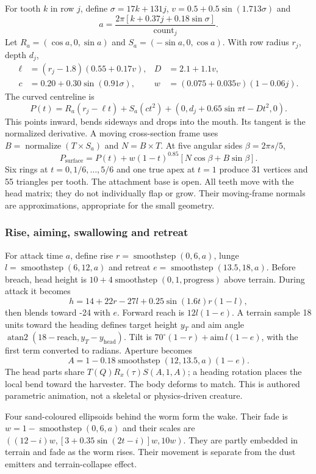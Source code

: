 For tooth $k$ in row $j$, define $\sigma=17k+131j$, $v=0.5+0.5\sin(1.713\sigma)$ and
\begin{equation}
a=\frac{2\pi[k+0.37j+0.18\sin\sigma]}{\mathrm{count}_j}.
\end{equation}
Let $R_a=(\cos a,0,\sin a)$ and $S_a=(-\sin a,0,\cos a)$. With row radius $r_j$, depth $d_j$,
\begin{align}
\ell&=(r_j-1.8)(0.55+0.17v),&D&=2.1+1.1v,\\
c&=0.20+0.30\sin(0.91\sigma),&w&=(0.075+0.035v)(1-0.06j).
\end{align}
The curved centreline is
\begin{equation}
P(t)=R_a(r_j-\ell t)+S_a(ct^2)+(0,d_j+0.65\sin\pi t-Dt^2,0).
\end{equation}
This points inward, bends sideways and drops into the mouth. Its tangent is the normalized derivative. A moving cross-section frame uses $B=\operatorname{normalize}(T\times S_a)$ and $N=B\times T$. At five angular sides $\beta=2\pi s/5$,
\begin{equation}
P_{\mathrm{surface}}=P(t)+w(1-t)^{0.85}[N\cos\beta+B\sin\beta].
\end{equation}
Six rings at $t=0,1/6,\ldots,5/6$ and one true apex at $t=1$ produce 31 vertices and 55 triangles per tooth. The attachment base is open. All teeth move with the head matrix; they do not individually flap or grow. Their moving-frame normals are approximations, appropriate for the small geometry.

\subsubsection{Rise, aiming, swallowing and retreat}
For attack time $a$, define rise $r=\operatorname{smoothstep}(0,6,a)$, lunge $l=\operatorname{smoothstep}(6,12,a)$ and retreat $e=\operatorname{smoothstep}(13.5,18,a)$. Before breach, head height is $10+4\operatorname{smoothstep}(0,1,\mathrm{progress})$ above terrain. During attack it becomes
\begin{equation}
h=14+22r-27l+0.25\sin(1.6t)r(1-l),
\end{equation}
then blends toward -24 with $e$. Forward reach is $12l(1-e)$. A terrain sample 18 units toward the heading defines target height $y_T$ and aim angle $\operatorname{atan2}(18-\mathrm{reach},y_T-y_{\mathrm{head}})$. Tilt is $70^\circ(1-r)+\mathrm{aim}\,l(1-e)$, with the first term converted to radians. Aperture becomes
\begin{equation}
A=1-0.18\operatorname{smoothstep}(12,13.5,a)(1-e).
\end{equation}
The head parts share $T(Q)R_x(\tau)S(A,1,A)$; a heading rotation places the local bend toward the harvester. The body deforms to match. This is authored parametric animation, not a skeletal or physics-driven creature.

Four sand-coloured ellipsoids behind the worm form the wake. Their fade is $w=1-\operatorname{smoothstep}(0,6,a)$ and their scales are $((12-i)w,[3+0.35\sin(2t-i)]w,10w)$. They are partly embedded in terrain and fade as the worm rises. Their movement is separate from the dust emitters and terrain-collapse effect.

